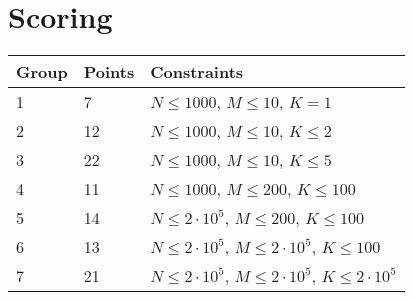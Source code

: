 \section*{Scoring}
\begin{tabular}{|l|l|l|}
    \hline
    Group & Points & Constraints \\ \hline
    1     &  7   & $N \leq 1000$,          $M \leq 10$, $K = 1$ \\ \hline %
    2     &  12  & $N \leq 1000$,          $M \leq 10$, $K \leq 2$ \\ \hline %
    3     &  22  & $N \leq 1000$,          $M \leq 10$, $K \leq 5$ \\ \hline %
    4     &  11  & $N \leq 1000$,         $M \leq 200$, $K \leq 100$ \\ \hline %
    5     &  14  & $N \leq 2 \cdot 10^5$, $M \leq 200$, $K \leq 100$ \\ \hline %
    6     &  13  & $N \leq 2 \cdot 10^5$, $M \leq 2 \cdot 10^5$, $K \leq 100$ \\ \hline %
    7     &  21  & $N \leq 2 \cdot 10^5$, $M \leq 2 \cdot 10^5$, $K \leq 2 \cdot 10^5$ \\ \hline %
\end{tabular}


